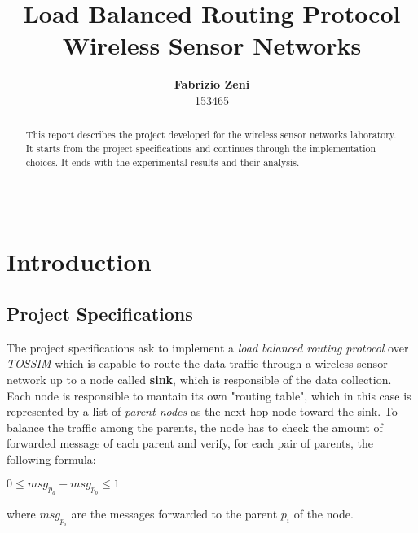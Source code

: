 \documentclass{article}
\title{
\vspace{2in}
\textmd{\textbf{Load Balanced Routing Protocol}}\\
\textmd{\normalsize{Wireless Sensor Networks}}\\
\vspace{3in}
}
\author{\textbf{Fabrizio Zeni} \\ \small{153465}}
\date{} %
\begin{document}
\maketitle %
\thispagestyle{empty}
\begin{center}
\begin{tabular}{l r}
\end{tabular}
\end{center}
\clearpage
\thispagestyle{empty}
\begin{abstract}
This report describes the project developed for the wireless sensor networks laboratory.
It starts from the project specifications and continues through the implementation choices.
It ends with the experimental results and their analysis.
\end{abstract}
\tableofcontents
\clearpage
\section{Introduction}
\subsection{Project Specifications}
The project specifications ask to implement a \emph{load balanced routing protocol} over \textit{TOSSIM} which is capable to route the data traffic through a wireless sensor network up to a node called \textbf{sink}, which is responsible of the data collection.
Each node is responsible to mantain its own "routing table", which in this case is represented by a list of \emph{parent nodes} as the next-hop node toward the sink. To balance the traffic among the parents, the node has to check the amount of forwarded message of each parent and verify, for each pair of parents, the following formula: \begin{center}$0 \leq msg_{p_{a}} - msg_{p_{b}} \leq 1$\end{center}
where $msg_{p_{i}}$ are the messages forwarded to the parent $p_{i}$ of the node.
\end{document}
